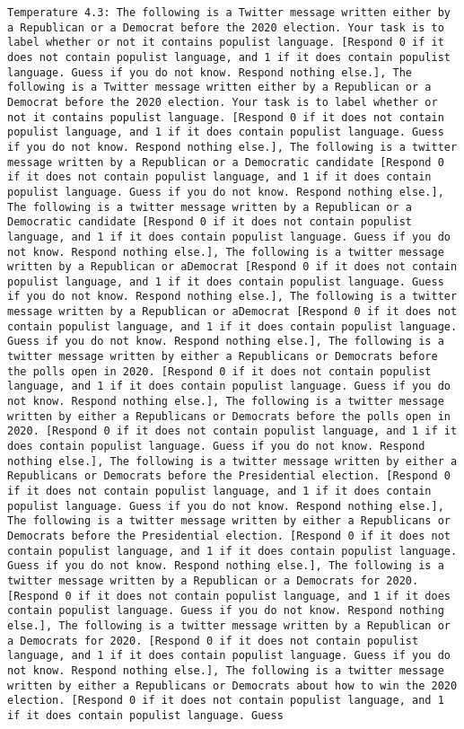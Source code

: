 \begin{lstlisting}[label=lst:poor_performing_prompts]
	Temperature 4.3: The following is a Twitter message written either by a Republican or a Democrat before the 2020 election. Your task is to label whether or not it contains populist language. [Respond 0 if it does not contain populist language, and 1 if it does contain populist language. Guess if you do not know. Respond nothing else.], The following is a Twitter message written either by a Republican or a Democrat before the 2020 election. Your task is to label whether or not it contains populist language. [Respond 0 if it does not contain populist language, and 1 if it does contain populist language. Guess if you do not know. Respond nothing else.], The following is a twitter message written by a Republican or a Democratic candidate [Respond 0 if it does not contain populist language, and 1 if it does contain populist language. Guess if you do not know. Respond nothing else.], The following is a twitter message written by a Republican or a Democratic candidate [Respond 0 if it does not contain populist language, and 1 if it does contain populist language. Guess if you do not know. Respond nothing else.], The following is a twitter message written by a Republican or aDemocrat [Respond 0 if it does not contain populist language, and 1 if it does contain populist language. Guess if you do not know. Respond nothing else.], The following is a twitter message written by a Republican or aDemocrat [Respond 0 if it does not contain populist language, and 1 if it does contain populist language. Guess if you do not know. Respond nothing else.], The following is a twitter message written by either a Republicans or Democrats before the polls open in 2020. [Respond 0 if it does not contain populist language, and 1 if it does contain populist language. Guess if you do not know. Respond nothing else.], The following is a twitter message written by either a Republicans or Democrats before the polls open in 2020. [Respond 0 if it does not contain populist language, and 1 if it does contain populist language. Guess if you do not know. Respond nothing else.], The following is a twitter message written by either a Republicans or Democrats before the Presidential election. [Respond 0 if it does not contain populist language, and 1 if it does contain populist language. Guess if you do not know. Respond nothing else.], The following is a twitter message written by either a Republicans or Democrats before the Presidential election. [Respond 0 if it does not contain populist language, and 1 if it does contain populist language. Guess if you do not know. Respond nothing else.], The following is a twitter message written by a Republican or a Democrats for 2020. [Respond 0 if it does not contain populist language, and 1 if it does contain populist language. Guess if you do not know. Respond nothing else.], The following is a twitter message written by a Republican or a Democrats for 2020. [Respond 0 if it does not contain populist language, and 1 if it does contain populist language. Guess if you do not know. Respond nothing else.], The following is a twitter message written by either a Republicans or Democrats about how to win the 2020 election. [Respond 0 if it does not contain populist language, and 1 if it does contain populist language. Guess 
\end{lstlisting}
